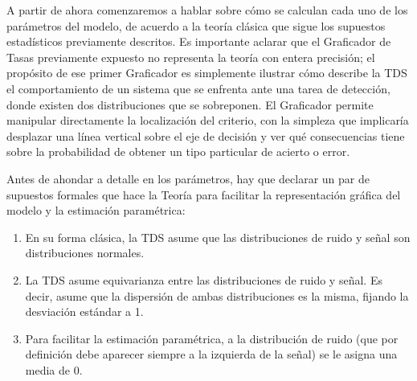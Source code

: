 A partir de ahora comenzaremos a hablar sobre cómo se calculan cada uno de los parámetros del modelo, de acuerdo a la teoría clásica que sigue los supuestos estadísticos previamente descritos.  Es importante aclarar que el Graficador de Tasas previamente expuesto no representa la teoría con entera precisión; el propósito de ese primer Graficador es simplemente ilustrar cómo describe la TDS el comportamiento de un sistema que se enfrenta ante una tarea de detección, donde existen dos distribuciones que se sobreponen. El Graficador permite manipular directamente la localización del criterio, con la simpleza que implicaría desplazar una línea vertical sobre el eje de decisión y ver qué consecuencias tiene sobre la probabilidad de obtener un tipo particular de acierto o error.


Antes de ahondar a detalle en los parámetros, hay que declarar un par de supuestos formales que hace la Teoría para facilitar la representación gráfica del modelo y la estimación paramétrica:

\begin{enumerate}
\item En su forma clásica, la TDS asume que las distribuciones de ruido y señal son distribuciones normales.
\item La TDS asume equivarianza entre las distribuciones de ruido y señal. Es decir, asume que la dispersión de ambas distribuciones es la misma, fijando la desviación estándar a 1.
\item Para facilitar la estimación paramétrica, a la distribución de ruido (que por definición debe aparecer siempre a la izquierda de la señal) se le asigna una media de 0.
\end{enumerate}


